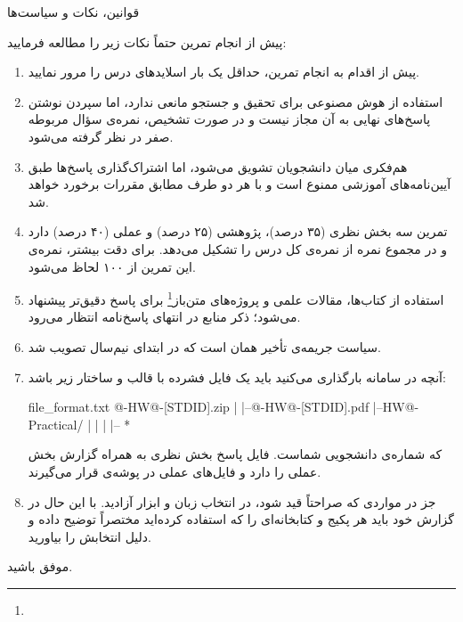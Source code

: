 \begin{neobox}[neotitlefont=\pixelfont]{قوانین، نکات و سیاست‌ها}

    \vspace{5mm}

    \begin{center}
        \Large{پیش از انجام تمرین حتماً نکات زیر را مطالعه فرمایید:}
    \end{center}

    \begin{enumerate}
        \item پیش از اقدام به انجام تمرین، حداقل یک بار اسلایدهای درس را مرور
              نمایید.

        \item استفاده از هوش مصنوعی برای تحقیق و جستجو مانعی ندارد، اما سپردن
              نوشتن پاسخ‌های نهایی به آن مجاز نیست و در صورت تشخیص، نمره‌ی
              سؤال مربوطه صفر در نظر گرفته می‌شود.

        \item هم‌فکری میان دانشجویان تشویق می‌شود، اما اشتراک‌گذاری پاسخ‌ها طبق
              آیین‌نامه‌های آموزشی ممنوع است و با هر دو طرف مطابق مقررات برخورد
              خواهد شد.

        \item تمرین سه بخش نظری (۳۵ درصد)، پژوهشی (۲۵ درصد) و عملی (۴۰ درصد)
              دارد و در مجموع \hwgrade{} نمره از نمره‌ی کل درس را تشکیل می‌دهد.
              برای دقت بیشتر، نمره‌ی این تمرین از ۱۰۰ لحاظ می‌شود.

        \item استفاده از کتاب‌ها، مقالات علمی و پروژه‌های
              متن‌باز\footnote{} برای پاسخ دقیق‌تر
              پیشنهاد می‌شود؛ ذکر منابع در انتهای پاسخ‌نامه انتظار می‌رود.

        \item سیاست جریمه‌ی تأخیر همان است که در ابتدای نیم‌سال تصویب شد.

        \item آنچه در سامانه بارگذاری می‌کنید باید یک فایل فشرده با قالب
               و ساختار زیر باشد:

              \begin{neocode}[neocodetitlefont=\pixelfont]{file\_format.txt}
@\coursecode@-HW@\hwnumber@-[STDID].zip
|
|--@\coursecode@-HW@\hwnumber@-[STDID].pdf
|--HW@\hwnumber@-Practical/
|       |
|       |-- *
              \end{neocode}

              که  شماره‌ی دانشجویی شماست. فایل 
              پاسخ بخش نظری به همراه گزارش بخش عملی را دارد و فایل‌های عملی در
              پوشه‌ی  قرار می‌گیرند.

        \item جز در مواردی که صراحتاً قید شود، در انتخاب زبان و ابزار آزادید.
              با این حال در گزارش خود باید هر پکیج و کتابخانه‌ای را که استفاده
              کرده‌اید مختصراً توضیح داده و دلیل انتخابش را بیاورید.
    \end{enumerate}

    \vspace{1cm}

    موفق باشید.

\end{neobox}
